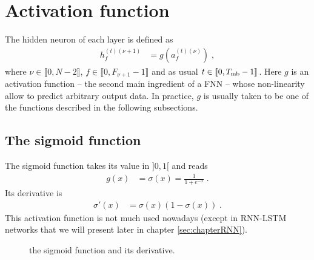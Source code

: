 \section{Activation function}

The hidden neuron of each layer is defined as
\begin{align}
h_{f}^{(t)(\nu+1)}&=g\left(a_{f}^{(t)(\nu)}\right)\;,
\end{align}
where $\nu\in\llbracket 0,N-2\rrbracket$, $f\in \llbracket 0,F_{\nu+1}-1\rrbracket$ and as usual $t \in \llbracket0,T_{{\rm mb}}-1\rrbracket$. Here $g$ is an activation function -- the second main ingredient of a FNN -- whose non-linearity allow to predict arbitrary output data. In practice, $g$ is usually taken to be one of the functions described in the following subsections.


\subsection{The sigmoid function}

The sigmoid function takes its value in $]0,1[$ and reads
\begin{align}
g(x)&=\sigma(x)=\frac{1}{1+e^{-x}}\;.
\end{align}
Its derivative is
\begin{align}
\sigma'(x)&=\sigma(x)\left(1-\sigma(x)\right)\;.
\end{align}
This activation function is not much used nowadays (except in RNN-LSTM networks that we will present later in chapter \ref{sec:chapterRNN}).

\begin{figure}[H]
\begin{center}
\end{center}
\caption{\label{fig:sigmoid} the sigmoid function and its derivative.}
\end{figure}

